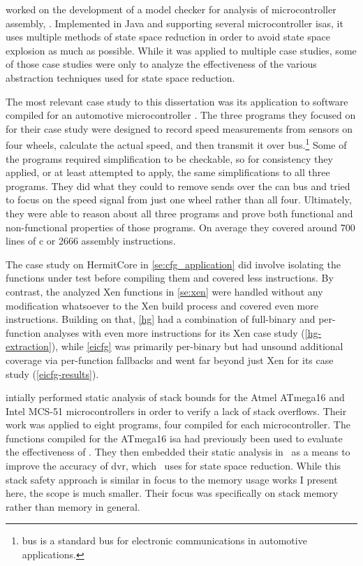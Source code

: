 \Textcite{schlich2008phd} worked on the development of a model checker for analysis
of microcontroller assembly, \mcsquare.
Implemented in Java and supporting several microcontroller \acp{isa},
it uses multiple methods of state space reduction in order to avoid state space explosion
as much as possible. While it was applied to multiple case studies,
some of those case studies were only to analyze the effectiveness
of the various abstraction techniques used for state space reduction.

The most relevant case study to this dissertation was its application
to software compiled for an automotive microcontroller \autocite{schlich2007automotive}.
The three programs they focused on for their case study
were designed to record speed measurements from sensors on four wheels,
calculate the actual speed, and then transmit it over  bus.\footnote{%
   bus is a standard bus for electronic communications
  in automotive applications. %
}
Some of the programs required simplification to be checkable,
so for consistency they applied, or at least attempted to apply,
the same simplifications to all three programs.
They did what they could to remove sends over the \ac{can} bus
and tried to focus on the speed signal from just one wheel rather than all four.
Ultimately, they were able to reason about all three programs
and prove both functional and non-functional properties of those programs.
On average they covered around \num{700} lines of \gls{c} or \num{2666} assembly instructions.
\begin{remark}
  The case study on HermitCore in \cref{se:cfg_application} did involve isolating the functions under test before compiling them and covered less instructions.
  By contrast, the analyzed Xen functions in \cref{se:xen} were handled without any modification whatsoever to the Xen build process and covered even more instructions.
  Building on that, \cref{hg} had a combination of full-binary and per-function analyses with even more instructions for its Xen case study (\cref{hg-extraction}), while \cref{eicfg} was primarily per-binary but had unsound additional coverage via per-function fallbacks and went far beyond just Xen for its case study (\cref{eicfg-results}).
\end{remark}

\Textcite{brauer2009sba} intially performed static analysis of stack bounds
for the Atmel ATmega16 and Intel MCS-51 microcontrollers
in order to verify a lack of stack overflows.
Their work was applied to eight programs, four compiled for each microcontroller.
The functions compiled for the ATmega16 \ac{isa}
had previously been used to evaluate the effectiveness of \mcsquare.
They then embedded their static analysis in \mcsquare\ as a means to
improve the accuracy of \ac{dvr}, which \mcsquare\ uses for state space reduction.
While this stack safety approach is similar in focus to the memory usage works
I present here, the scope is much smaller.
Their focus was specifically on stack memory rather than memory in general.

